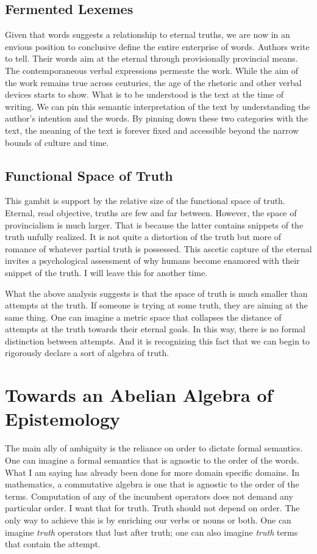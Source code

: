 \documentclass[12pt]{article}
\begin{document}
\subsection{Fermented Lexemes}
Given that words suggests a relationship to eternal truths, we are now in an
envious position to conclusive define the entire enterprise of words. Authors
write to tell. Their words aim at the eternal through provisionally provincial
means. The contemporaneous verbal expressions permeate the work. While the aim
of the work remains true across centuries, the age of the rhetoric and other verbal
devices starts to show. What is to be understood is the text at the time of
writing. We can pin this semantic interpretation of the text by understanding
the author's intention and the words. By pinning down these two categories with
the text, the meaning of the text is forever fixed and accessible beyond the
narrow bounds of culture and time.

\subsection{Functional Space of Truth}
This gambit is support by the relative size of the functional space of truth.
Eternal, read objective, truths are few and far between. However, the space of
provincialism is much larger. That is because the latter contains snippets of
the truth unfully realized. It is not quite a distortion of the truth but more
of romance of whatever partial truth is possessed. This ascetic capture of the
eternal invites a psychological assessment of why humans become enamored with
their snippet of the truth. I will leave this for another time.

What the above analysis suggests is that the space of truth is much smaller than
attempts at the truth. If someone is trying at some truth, they are aiming at
the same thing. One can imagine a metric space that collapses the distance of
attempts at the truth towards their eternal goals. In this way, there is no
formal distinction between attempts. And it is recognizing this fact that we can
begin to rigorously declare a sort of algebra of truth.

\section{Towards an Abelian Algebra of Epistemology}
The main ally of ambiguity is the reliance on order to dictate formal semantics.
One can imagine a formal semantics that is agnostic to the order of the words.
What I am saying has already been done for more domain specific domains. In
mathematics, a commutative algebra is one that is agnostic to the order of the
terms. Computation of any of the incumbent operators does not demand any
particular order. I want that for truth. Truth should not depend on order. The
only way to achieve this is by enriching our verbs or nouns or both. One can
imagine \textit{truth} operators that lust after truth; one can also imagine
\textit{truth} terms that contain the attempt.
\end{document}
